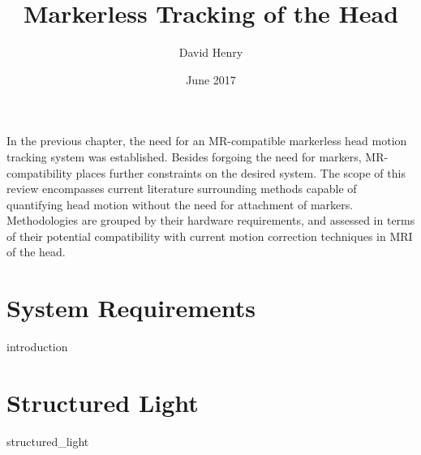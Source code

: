 \documentclass{article}
\title{Markerless Tracking of the Head}
\author{David Henry}
\date{June 2017}
\begin{document}
\maketitle
In the previous chapter, the need for an MR-compatible markerless head motion tracking system was established. Besides forgoing the need for markers, MR-compatibility places further constraints on the desired system. The scope of this review encompasses current literature surrounding methods capable of quantifying head motion without the need for attachment of markers. Methodologies are grouped by their hardware requirements, and assessed in terms of their potential compatibility with current motion correction techniques in MRI of the head.


\section{System Requirements} \label{Section1}
{introduction}

\section{Structured Light} \label{Section2}
{structured_light}


\printbibliography
\end{document}
